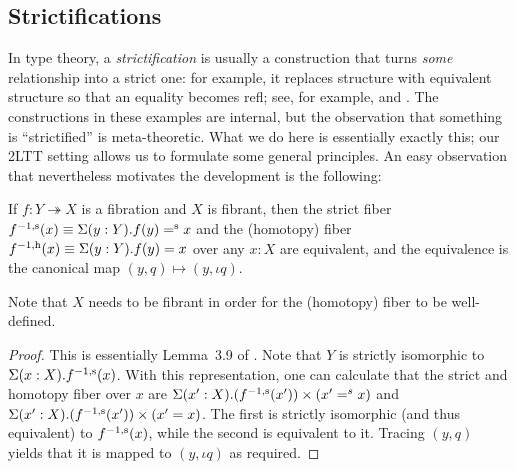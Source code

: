 \subsection{Strictifications}

In type theory, a \emph{strictification} is usually a construction that turns \emph{some} relationship into a strict one: for example, it replaces structure with equivalent structure so that an equality becomes refl; see, for example, \citet{rice_Cayley} and \citet{kaposi2025type}.
The constructions in these examples are internal, but the observation that something is ``strictified'' is meta-theoretic.
What we do here is essentially exactly this; our 2LTT setting allows us to formulate some general principles.
An easy observation that nevertheless motivates the development is the following: 

\begin{lemma}\label{lem:strict-vs-homotopy-fibre}
	If $f : Y \twoheadrightarrow X$ is a fibration and $X$ is fibrant, then the strict fiber ${f}^{-1, \textup{s}} (x) \equiv \Sigma(y:Y).f(y)\mathrel{=^\textup{s}} x$ and the (homotopy) fiber ${f}^{-1, \textup{h}} (x) \equiv \Sigma(y:Y).f(y)=x$ over any $x : X$ are equivalent, and the equivalence is the canonical map $(y,q) \mapsto (y, \iota q)$.
\end{lemma}
Note that $X$ needs to be fibrant in order for the (homotopy) fiber to be well-defined.
\begin{proof}
	This is essentially Lemma~3.9 of \citet{2LTT}. Note that $Y$ is strictly isomorphic to $\Sigma(x:X). {f}^{-1, \textup{s}}(x)$. With this representation, one can calculate that the strict and homotopy fiber over $x$ are $\Sigma(x':X).({f}^{-1, \textup{s}}(x')) \times (x' =^s x)$ and $\Sigma(x':X).({f}^{-1, \textup{s}}(x')) \times (x' = x)$.
	The first is strictly isomorphic (and thus equivalent) to ${f}^{-1, \textup{s}}(x)$, while the second is equivalent to it.
	Tracing $(y,q)$ yields that it is mapped to $(y,\iota q)$ as required.
\end{proof}


